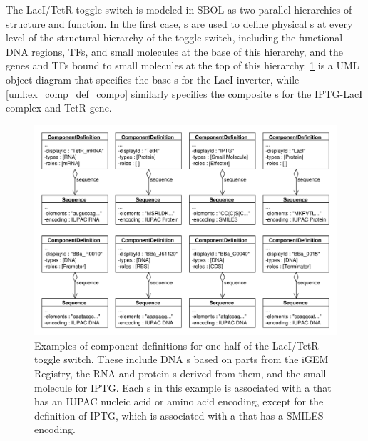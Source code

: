 The LacI/TetR toggle switch is modeled in SBOL as two parallel hierarchies of structure and function. In the first case, s are used to define physical s at every level of the structural hierarchy of the toggle switch, including the functional DNA regions, TFs, and small molecules at the base of this hierarchy, and the genes and TFs bound to small molecules at the top of this hierarchy. \ref{uml:ex_comp_defs} is a UML object diagram that specifies the base s for the LacI inverter, while \ref{uml:ex_comp_def_compo} similarly specifies the composite s for the IPTG-LacI complex and TetR gene. 

\begin{figure}[ht]
\begin{center}
\includegraphics[width=\textwidth]{example_uml/toggle_1}
\caption[]{Examples of component definitions for one half of the LacI/TetR toggle switch. These include DNA s based on parts from the iGEM Registry, the RNA and protein s derived from them, and the small molecule  for IPTG. Each s in this example is associated with a  that has an IUPAC nucleic acid or amino acid encoding, except for the definition of IPTG, which is associated with a  that has a SMILES encoding.}
\label{uml:ex_comp_defs}
\end{center}
\end{figure}

